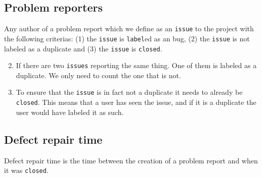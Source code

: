 \subsection*{Problem reporters}
Any author of a problem report which we define as an \texttt{issue} to the project with the following criterias: (1) the \texttt{issue} is \texttt{label}ed as an bug, (2) the \texttt{issue} is not labeled as a duplicate and (3) the \texttt{issue} is \texttt{closed}.
\begin{enumerate}
	\setcounter{enumi}{1}
	\item If there are two \texttt{issues} reporting the same thing. One of them is labeled as a duplicate. We only need to count the one that is not.
	\item To ensure that the \texttt{issue} is in fact not a duplicate it needs to already be \texttt{closed}. This means that a user has seen the issue, and if it is a duplicate the user would have labeled it as such.
\end{enumerate}
\subsection*{Defect repair time}
Defect repair time is the time between the creation of a problem report and when it was \texttt{closed}.
